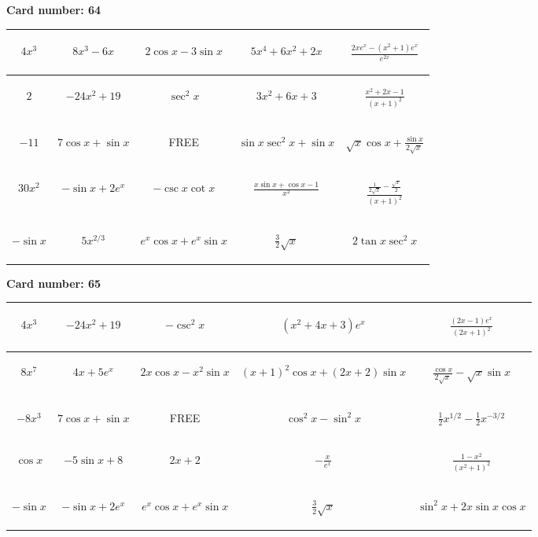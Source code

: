 \documentclass{article}
\newcommand{\entry}[1]{\begin{minipage}[t][2.75cm][t]{4cm} \vspace{1cm} \begin{center}#1\end{center} \end{minipage}}
\newcommand{\freespace}{\entry{FREE}}
\newcommand{\cardnumber}[1]{\noindent \textbf{Card number: #1} \bigskip}
\begin{document}
\pagebreak

\cardnumber{64}
\begin{center}
\begin{tabular}{|*{5}{c|}}
    \hline
    \entry{$4x^3$} & \entry{$8x^3 - 6x$} & \entry{$2 \cos x - 3 \sin x$} & \entry{$5x^4 + 6x^2 + 2x$} & \entry{$\frac{2x e^x - (x^2 + 1) e^x}{e^{2x}}$} \\ \hline
    \entry{$2$} & \entry{$-24x^2 + 19$} & \entry{$\sec^2 x$} & \entry{$3x^2 + 6x + 3$} & \entry{$\frac{x^2 + 2x - 1}{(x + 1)^2}$} \\ \hline
    \entry{$-11$} & \entry{$7 \cos x + \sin x$} & \freespace & \entry{$\sin x \sec^2 x + \sin x$} & \entry{$\sqrt{x} \cos x + \frac{\sin x}{2 \sqrt{x}}$} \\ \hline
    \entry{$30x^2$} & \entry{$-\sin x + 2e^x$} & \entry{$-\csc x \cot x$} & \entry{$\frac{x \sin x + \cos x - 1}{x^2}$} & \entry{$\frac{\frac{1}{2 \sqrt{x}} - \frac{\sqrt{x}}{2}}{(x + 1)^2}$} \\ \hline
    \entry{$-\sin x$} & \entry{$5x^{2/3}$} & \entry{$e^x \cos x + e^x \sin x$} & \entry{$\frac{3}{2} \sqrt{x}$} & \entry{$2 \tan x \sec^2 x$} \\ \hline
\end{tabular}
\end{center}

\pagebreak

\cardnumber{65}
\begin{center}
\begin{tabular}{|*{5}{c|}}
    \hline
    \entry{$4x^3$} & \entry{$-24x^2 + 19$} & \entry{$-\csc^2 x$} & \entry{$(x^2 + 4x + 3) e^x$} & \entry{$\frac{(2x - 1) e^x}{(2x + 1)^2}$} \\ \hline
    \entry{$8x^7$} & \entry{$4x + 5e^x$} & \entry{$2x \cos x - x^2 \sin x$} & \entry{$(x + 1)^2 \cos x + (2x + 2) \sin x$} & \entry{$\frac{\cos x}{2 \sqrt{x}} - \sqrt{x} \sin x$} \\ \hline
    \entry{$-8x^3$} & \entry{$7 \cos x + \sin x$} & \freespace & \entry{$\cos^2 x - \sin^2 x$} & \entry{$\frac{1}{2} x^{1/2} - \frac{1}{2} x^{-3/2}$} \\ \hline
    \entry{$\cos x$} & \entry{$-5 \sin x + 8$} & \entry{$2x + 2$} & \entry{$-\frac{x}{e^x}$} & \entry{$\frac{1 - x^2}{(x^2 + 1)^2}$} \\ \hline
    \entry{$-\sin x$} & \entry{$-\sin x + 2e^x$} & \entry{$e^x \cos x + e^x \sin x$} & \entry{$\frac{3}{2} \sqrt{x}$} & \entry{$\sin^2 x + 2x \sin x \cos x$} \\ \hline
\end{tabular}
\end{center}
\end{document}
